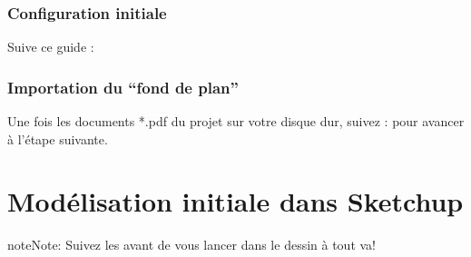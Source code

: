 \documentclass[a4paper,12pt,french]{sphinxmanual}
\begin{document}
\subsubsection{Configuration initiale}
\label{init_su+acad/002_demarrage:configuration-initiale}
Suive ce guide : {\hyperref[su/config\string-su::doc]{}}


\subsubsection{Importation du ``fond de plan''}
\label{init_su+acad/002_demarrage:init-su-acad-import-img-su}\label{init_su+acad/002_demarrage:importation-du-fond-de-plan}
Une fois les documents *.pdf du projet sur votre disque dur, suivez : {\hyperref[su/import\string-ssqu::doc]{}} pour avancer à l'étape suivante.


\section{Modélisation initiale dans Sketchup}
\label{init_su+acad/003_su1:modelisation-initiale-dans-su}\label{init_su+acad/003_su1::doc}\label{init_su+acad/003_su1:su1}
\begin{notice}{note}{Note:}
Suivez les {\hyperref[su/intro\string-su:notions\string-essentielles\string-su]{}} avant de vous lancer dans le dessin à tout va!
\end{notice}
\end{document}
